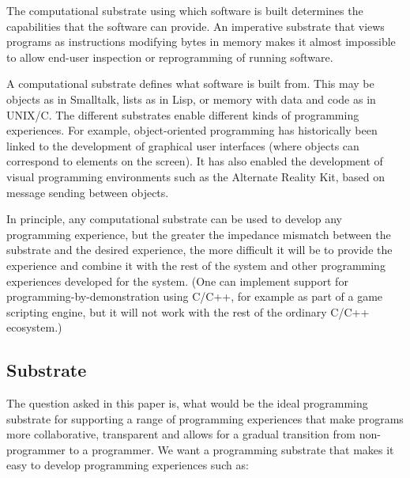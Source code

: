 \documentclass[sigconf]{acmart}
\begin{document}
The computational substrate using which software is built determines the capabilities that the
software can provide. An imperative substrate that views programs as instructions modifying
bytes in memory makes it almost impossible to allow end-user inspection or reprogramming of
running software.

A computational substrate defines what software is built from. This may be objects as in
Smalltalk, lists as in Lisp, or memory with data and code as in UNIX/C.
The different substrates enable different kinds of programming experiences.
For example, object-oriented programming has historically been linked to the development
of graphical user interfaces (where objects can correspond to elements on the screen).
It has also enabled the development of visual programming environments such as the Alternate
Reality Kit, based on message sending between objects.

In principle, any computational substrate can be used to develop any programming experience,
but the greater the impedance mismatch between the substrate and the desired experience,
the more difficult it will be to provide the experience and combine it with the rest of the
system and other programming experiences developed for the system. (One can implement support
for programming-by-demonstration using C/C++, for example as part of a game scripting engine,
but it will not work with the rest of the ordinary C/C++ ecosystem.)

\subsection{Substrate}

The question asked in this paper is, what would be the ideal programming substrate
for supporting a range of programming experiences that make programs more
collaborative, transparent and allows for a gradual transition from non-programmer
to a programmer. We want a programming substrate that makes it easy to develop
programming experiences such as:
\end{document}
